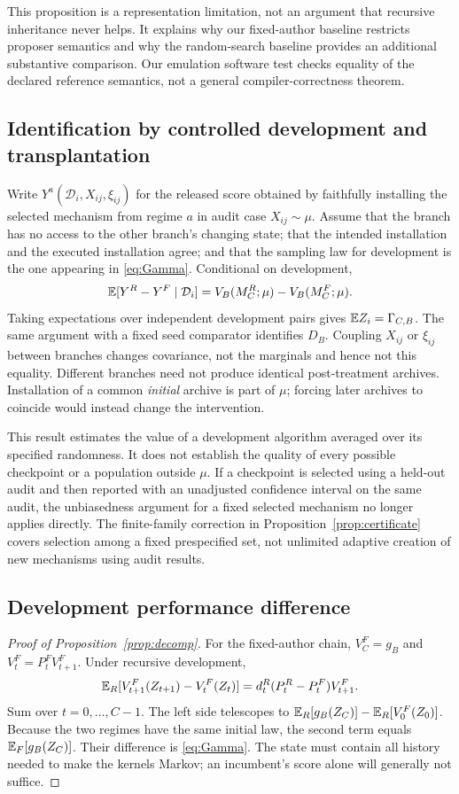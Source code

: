 This proposition is a representation limitation, not an argument that recursive inheritance never helps. It explains why our fixed-author baseline restricts proposer semantics and why the random-search baseline provides an additional substantive comparison. Our emulation software test checks equality of the declared reference semantics, not a general compiler-correctness theorem.

\subsection{Identification by controlled development and transplantation}
Write $Y^a(\mathcal D_i,X_{ij},\xi_{ij})$ for the released score obtained by faithfully installing the selected mechanism from regime $a$ in audit case $X_{ij}\sim\mu$. Assume that the branch has no access to the other branch's changing state; that the intended installation and the executed installation agree; and that the sampling law for development is the one appearing in \eqref{eq:Gamma}. Conditional on development,
\[
 \mathbb E[Y^R-Y^F\mid\mathcal D_i]
 =V_B(M_C^R;\mu)-V_B(M_C^F;\mu).
\]
Taking expectations over independent development pairs gives $\mathbb E Z_i=\Gamma_{C,B}$. The same argument with a fixed seed comparator identifies $D_B$. Coupling $X_{ij}$ or $\xi_{ij}$ between branches changes covariance, not the marginals and hence not this equality. Different branches need not produce identical post-treatment archives. Installation of a common \emph{initial} archive is part of $\mu$; forcing later archives to coincide would instead change the intervention.

This result estimates the value of a development algorithm averaged over its specified randomness. It does not establish the quality of every possible checkpoint or a population outside $\mu$. If a checkpoint is selected using a held-out audit and then reported with an unadjusted confidence interval on the same audit, the unbiasedness argument for a fixed selected mechanism no longer applies directly. The finite-family correction in Proposition~\ref{prop:certificate} covers selection among a fixed prespecified set, not unlimited adaptive creation of new mechanisms using audit results.

\subsection{Development performance difference}
\begin{proof}[Proof of Proposition~\ref{prop:decomp}]
For the fixed-author chain, $V_C^F=g_B$ and $V_t^F=P_t^FV_{t+1}^F$. Under recursive development,
\[
 \mathbb E_R[V_{t+1}^F(Z_{t+1})-V_t^F(Z_t)]
 =d_t^R(P_t^R-P_t^F)V_{t+1}^F.
\]
Sum over $t=0,\ldots,C-1$. The left side telescopes to
$\mathbb E_R[g_B(Z_C)]-\mathbb E_R[V_0^F(Z_0)]$.
Because the two regimes have the same initial law, the second term equals $\mathbb E_F[g_B(Z_C)]$. Their difference is \eqref{eq:Gamma}. The state must contain all history needed to make the kernels Markov; an incumbent's score alone will generally not suffice.
\end{proof}

